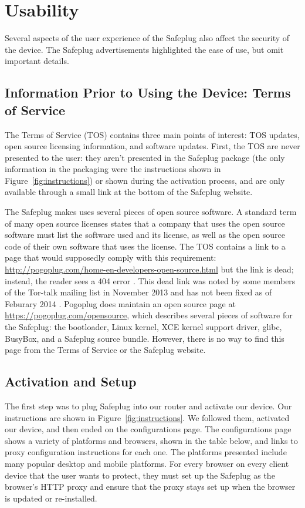 \documentclass[letterpaper,twocolumn,10pt]{article}
\begin{document}
\section{Usability}
Several aspects of the user experience of the Safeplug also affect the security of the device.  The Safeplug advertisements highlighted the ease of use, but omit important details.

\subsection{Information Prior to Using the Device: Terms of Service}
\label{tos}
The Terms of Service (TOS) contains three main points of interest: TOS updates, open source licensing information, and software updates.  First, the TOS are never presented to the user: they aren't presented in the Safeplug package (the only information in the packaging were the instructions shown in Figure~\ref{fig:instructions}) or shown during the activation process, and are only available through a small link at the bottom of the Safeplug website\cite{safeplug}.  

The Safeplug makes uses several pieces of open source software.  A standard term of many open source licenses states that a company that uses the open source software must list the software used and its license, as well as the open source code of their own software that uses the license.  The TOS contains a link to a page that would supposedly comply with this requirement: \url{http://pogoplug.com/home-en-developers-open-source.html} but the link is dead; instead, the reader sees a 404 error \cite{safeplug}.  This dead link was noted by some members of the Tor-talk mailing list in November 2013 and has not been fixed as of Feburary 2014 \cite{tormailinglist}.  Pogoplug does maintain an open source page at \url{https://pogoplug.com/opensource}, which describes several pieces of software for the Safeplug: the bootloader, Linux kernel, XCE kernel support driver, glibc, BusyBox, and a Safeplug source bundle.  However, there is no way to find this page from the Terms of Service or the Safeplug website.

\subsection{Activation and Setup}
The first step was to plug Safeplug into our router and activate our device.  Our instructions are shown in Figure~\ref{fig:instructions}.  We followed them, activated our device, and then ended on the configurations page.  The configurations page shows a variety of platforms and browsers, shown in the table below, and links to proxy configuration instructions for each one.  The platforms presented include many popular desktop and mobile platforms.  For every browser on every client device that the user wants to protect, they must set up the Safeplug as the browser's HTTP proxy and ensure that the proxy stays set up when the browser is updated or re-installed.
\end{document}
